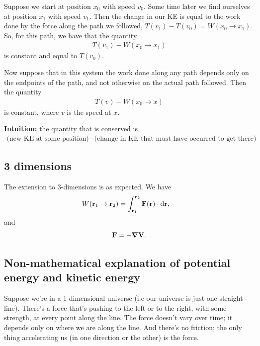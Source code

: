 Suppose we start at position $x_0$ with speed $v_0$. Some time later we find ourselves at position
$x_1$ with speed $v_1$. Then the change in our KE is equal to the work done by the force along the
path we followed, $T(v_1) - T(v_0) = W(x_0 \to x_1)$. So, for this path, we have that the quantity
\begin{align*}
  T(v_1) - W(x_0 \to x_1)
\end{align*}
is constant and equal to $T(v_0)$.


Now suppose that in this system the work done along any path depends only on the endpoints of the
path, and not otherwise on the actual path followed. Then the quantity
\begin{align*}
  T(v) - W(x_0 \to x)
\end{align*}
is constant, where $v$ is the speed at $x$.

{\bf Intuition:} the quantity that is conserved is
\begin{align*}
  \text{(new KE at some position)} - \text{(change in KE that must have occurred to get there)}
\end{align*}

\subsection{3 dimensions}

The extension to 3-dimensions is as expected. We have
\begin{align*}
  W(\r_1 \to \r_2) &= \int_{\r_1}^{\r_2} \F(\r) \cdot \d\r,
\end{align*}
and
\begin{align*}
  \mathbf{F} = -\grad \mathbf{V}.
\end{align*}



\subsection{Non-mathematical explanation of potential energy and kinetic energy}

Suppose we're in a 1-dimensional universe (i.e our universe is just one straight line). There's a
force that's pushing to the left or to the right, with some strength, at every point along the
line. The force doesn't vary over time; it depends only on where we are along the line. And there's
no friction; the only thing accelerating us (in one direction or the other) is the force.


